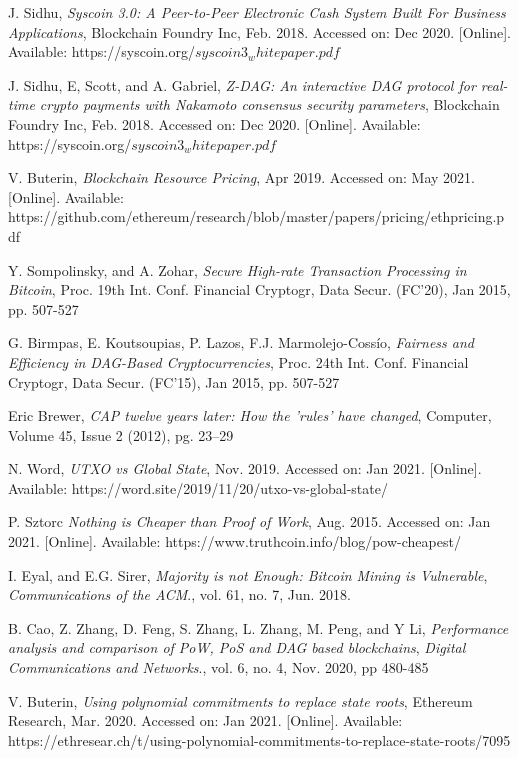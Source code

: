 \documentclass[peerreview]{ieeesyscoin}
\begin{document}
\begin{thebibliography}{00}


 J. Sidhu, \textit{Syscoin 3.0: A Peer-to-Peer Electronic Cash System Built For Business Applications}, Blockchain Foundry Inc, Feb. 2018. Accessed on: Dec 2020. [Online]. Available: https://syscoin.org/$syscoin3_whitepaper.pdf$

 J. Sidhu, E, Scott, and A. Gabriel, \textit{Z-DAG: An interactive DAG protocol for real-time crypto payments with Nakamoto consensus security parameters}, Blockchain Foundry Inc, Feb. 2018. Accessed on: Dec 2020. [Online]. Available: https://syscoin.org/$syscoin3_whitepaper.pdf$

 V. Buterin,  \textit{Blockchain Resource Pricing}, Apr 2019. Accessed on: May 2021. [Online]. Available: https://github.com/ethereum/research/blob/master/papers/pricing/ethpricing.pdf

 Y. Sompolinsky, and A. Zohar, \textit{Secure High-rate Transaction Processing in Bitcoin}, Proc. 19th Int. Conf. Financial Cryptogr, Data Secur. (FC’20), Jan 2015, pp. 507-527

 G. Birmpas, E. Koutsoupias, P. Lazos, F.J. Marmolejo-Cossío, \textit{Fairness and Efficiency in DAG-Based Cryptocurrencies}, Proc. 24th Int. Conf. Financial Cryptogr, Data Secur. (FC’15), Jan 2015, pp. 507-527

 Eric Brewer, \textit{CAP twelve years later: How the 'rules' have changed}, Computer, Volume 45, Issue 2 (2012), pg. 23–29

 N. Word, \textit{UTXO vs Global State}, Nov. 2019. Accessed on: Jan 2021. [Online]. Available: https://word.site/2019/11/20/utxo-vs-global-state/

 P. Sztorc \textit{Nothing is Cheaper than Proof of Work}, Aug. 2015. Accessed on: Jan 2021. [Online]. Available: https://www.truthcoin.info/blog/pow-cheapest/

 I. Eyal, and E.G. Sirer, \textit{Majority is not Enough: Bitcoin Mining is Vulnerable}, \emph{Communications of the ACM}., vol. 61, no. 7, Jun. 2018.

 B. Cao, Z. Zhang, D. Feng, S. Zhang, L. Zhang, M. Peng, and
Y Li, \textit{Performance analysis and comparison of PoW, PoS and DAG based blockchains}, \emph{Digital Communications and Networks}., vol. 6, no. 4, Nov. 2020, pp 480-485

 V. Buterin, \textit{Using polynomial commitments to replace state roots}, Ethereum Research, Mar. 2020. Accessed on: Jan 2021. [Online]. Available: https://ethresear.ch/t/using-polynomial-commitments-to-replace-state-roots/7095


\end{thebibliography}
\end{document}

